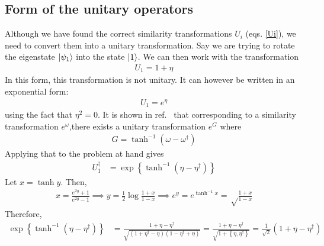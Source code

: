 \subsection*{Form of the unitary operators}\label{unitary-form}
Although we have found the correct similarity transformations \(U_i\) (eqs. \ref{Ui}), we need to convert them into a unitary transformation. Say we are trying to rotate the eigenstate \(\ket{\psi_1}\) into the state \(\ket{1}\). We can then work with the transformation
\begin{equation}\begin{aligned}
U_1 = 1 + \eta
\end{aligned}\end{equation}
In this form, this transformation is not unitary. It can however be written in an exponential form:
\begin{equation}\begin{aligned}
U_1 = e^{\eta}
\end{aligned}\end{equation}
using the fact that \(\eta^2 = 0\). It is shown in ref.~\cite{suzuki1984general} that corresponding to a similarity transformation \(e^\omega\),there exists a unitary transformation \(e^G\) where
\begin{equation}\begin{aligned}
	G = \tanh^{-1}\left(\omega - \omega^\dagger\right)
\end{aligned}\end{equation}
Applying that to the problem at hand gives
\begin{equation}\begin{aligned}
	U_1^\dagger &= \exp\left\{\tanh^{-1}\left(\eta - \eta^\dagger\right)\right\}
 \end{aligned}\end{equation}
Let \(x = \tanh y\). Then,
\begin{equation}\begin{aligned}
x = \frac{e^{2y} + 1}{e^{2y} - 1} \implies y = \frac{1}{2} \log\frac{1+x}{1-x} \implies e^y = e^{\tanh^{-1}x} = \sqrt\frac{1+x}{1-x}
\end{aligned}\end{equation}
Therefore,
\begin{equation}\begin{aligned}
	\exp\left\{\tanh^{-1}\left(\eta - \eta^\dagger\right)\right\} &= \frac{1 + \eta - \eta^\dagger}{\sqrt{\left(1 + \eta^\dagger - \eta\right)\left(1 - \eta^\dagger + \eta\right)}} = \frac{1 + \eta - \eta^\dagger}{\sqrt{1 + \left\{\eta,\eta^\dagger\right\}}} = \frac{1}{\sqrt 2}\left(1 + \eta - \eta^\dagger\right)
\end{aligned}\end{equation}
